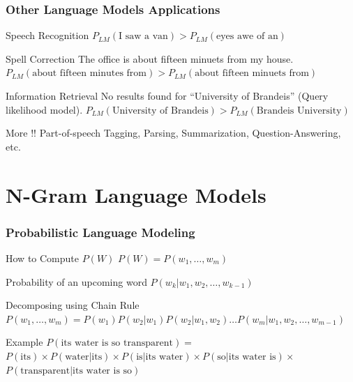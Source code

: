 \documentclass{beamer}
\begin{document}
\begin{frame}\frametitle{Other Language Models Applications}

\begin{block}{Speech Recognition}
  \quad $P_{LM}(\text{I saw a van}) > P_{LM}(\text{eyes awe of an})$
\end{block}

\begin{block}{Spell Correction}
The office is about fifteen minuets from my house. \\
  \quad $P_{LM}(\text{about fifteen minutes from}) >
  P_{LM}(\text{about fifteen minuets from})$
\end{block}

\begin{block}{Information Retrieval}
No results found for ``University of Brandeis'' (Query likelihood model).
  \quad $P_{LM}(\text{University of Brandeis}) >
  P_{LM}(\text{Brandeis University})$
\end{block}

\begin{block}{More !!}
Part-of-speech Tagging, Parsing, Summarization, Question-Answering,
etc.
\end{block}
\end{frame}


\section{N-Gram Language Models}

\begin{frame}\frametitle{Probabilistic Language Modeling}

\begin{block}{How to Compute $P(W)$}
  \quad $P(W) = P(w_1,\ldots,w_m)$
\end{block}

\begin{block}{Probability of an upcoming word}
 \quad  $P(w_k|w_1, w_2, \ldots, w_{k-1})$
\end{block}

\begin{block}{Decomposing using Chain Rule}
  \quad $P(w_1,\ldots,w_m) = P(w_1)P(w_2|w_1)P(w_2|w_1, w_2)\ldots P(w_m|w_1, w_2, \ldots, w_{m-1})$
\end{block}

\begin{block}{Example}
\quad $P(\text{its water is so transparent}) = $ \\ $P(\text{its})
\times P(\text{water}|\text{its}) \times P(\text{is}|\text{its water})
\times P(\text{so}|\text{its water is}) \times $ \\
$P(\text{transparent}|\text{its water is so})$
\end{block}
\end{frame}
\end{document}

